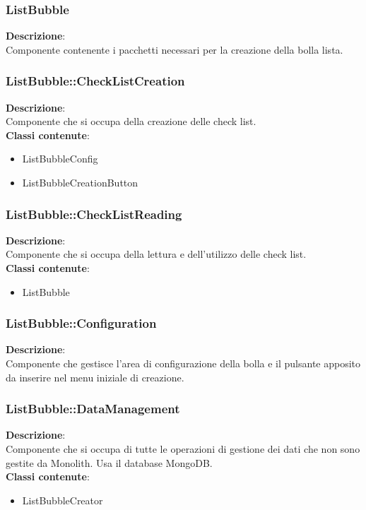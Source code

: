 \clearpage

\subsubsection{ListBubble}
\textbf{Descrizione}:\\
 Componente contenente i pacchetti necessari per la creazione della bolla lista. 


\clearpage

\subsubsection{ListBubble::CheckListCreation}
\textbf{Descrizione}:\\
 Componente che si occupa della creazione delle check list. 
\\ \textbf{Classi contenute}:\\
\begin{itemize}
\item ListBubbleConfig
\item ListBubbleCreationButton
\end{itemize}


\clearpage

\subsubsection{ListBubble::CheckListReading}
\textbf{Descrizione}:\\
 Componente che si occupa della lettura e dell'utilizzo delle check list. 
\\ \textbf{Classi contenute}:\\
\begin{itemize}
\item ListBubble
\end{itemize}


\clearpage

\subsubsection{ListBubble::Configuration}
\textbf{Descrizione}:\\
 Componente che gestisce l'area di configurazione della bolla e il pulsante apposito da inserire nel menu iniziale di creazione. 


\clearpage

\subsubsection{ListBubble::DataManagement}
\textbf{Descrizione}:\\
 Componente che si occupa di tutte le operazioni di gestione dei dati che non sono gestite da Monolith. Usa il database MongoDB. 
\\ \textbf{Classi contenute}:\\
\begin{itemize}
\item ListBubbleCreator
\end{itemize}


